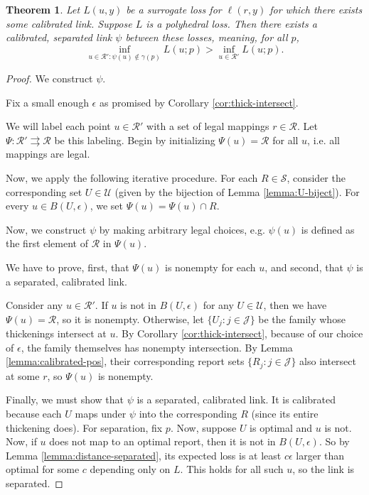 \documentclass{article}
\newcommand{\R}{\mathcal{R}}
\newcommand{\toto}{\rightrightarrows}
\newtheorem{theorem}{Theorem}
\begin{document}
\begin{theorem}
  Let $L(u,y)$ be a surrogate loss for $\ell(r,y)$ for which there exists some calibrated link.
  Suppose $L$ is a polyhedral loss.
  Then there exists a calibrated, \emph{separated} link $\psi$ between these losses, meaning, for all $p$,
    \[ \inf_{u \in \R' : \psi(u) \not\in \gamma(p)} L(u;p) > \inf_{u \in \R'} L(u;p) . \]
\end{theorem}
\begin{proof}
  We construct $\psi$.
  
  Fix a small enough $\epsilon$ as promised by Corollary \ref{cor:thick-intersect}.
  
  We will label each point $u \in \R'$ with a set of legal mappings $r \in \R$.
  Let $\Psi: \R' \toto \R$ be this labeling.
  Begin by initializing $\Psi(u) = \R$ for all $u$, i.e. all mappings are legal.
  
  Now, we apply the following iterative procedure.
  For each $R \in \mathcal{S}$, consider the corresponding set $U \in \mathcal{U}$ (given by the bijection of Lemma \ref{lemma:U-biject}).
  For every $u \in B\left(U, \epsilon\right)$, we set $\Psi(u) = \Psi(u) \cap R$.
  
  Now, we construct $\psi$ by making arbitrary legal choices, e.g. $\psi(u)$ is defined as the first element of $\R$ in $\Psi(u)$.
  
  We have to prove, first, that $\Psi(u)$ is nonempty for each $u$, and second, that $\psi$ is a separated, calibrated link.
  
  Consider any $u \in \R'$.
  If $u$ is not in $B(U,\epsilon)$ for any $U \in \mathcal{U}$, then we have $\Psi(u) = \R$, so it is nonempty.
  Otherwise, let $\{U_j : j \in \mathcal{J}\}$ be the family whose thickenings intersect at $u$.
  By Corollary \ref{cor:thick-intersect}, because of our choice of $\epsilon$, the family themselves has nonempty intersection.
  By Lemma \ref{lemma:calibrated-pos}, their corresponding report sets $\{R_j : j \in \mathcal{J}\}$ also intersect at some $r$, so $\Psi(u)$ is nonempty.
  
  Finally, we must show that $\psi$ is a separated, calibrated link.
  It is calibrated because each $U$ maps under $\psi$ into the corresponding $R$ (since its entire thickening does).
  For separation, fix $p$. Now, suppose $U$ is optimal and $u$ is not.
  Now, if $u$ does not map to an optimal report, then it is not in $B(U,\epsilon)$.
  So by Lemma \ref{lemma:distance-separated}, its expected loss is at least $c\epsilon$ larger than optimal for some $c$ depending only on $L$.
  This holds for all such $u$, so the link is separated.
\end{proof}
\end{document}
